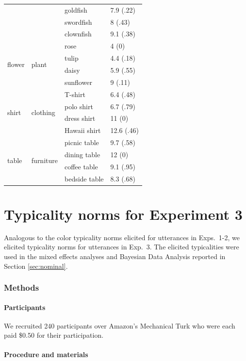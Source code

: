\documentclass[11pt]{article}
\newcommand{\sectionref}[1]{Section \ref{#1}}
\begin{document}
\begin{table}
\begin{tabular}{l l l l}
		& & goldfish & 7.9 (.22)\\
		& & swordfish & 8 (.43)\\
		& & clownfish & 9.1 (.38)\\
	\midrule
	\multirow{4}{*}{flower} & \multirow{4}{*}{plant} & rose & 4 (0)\\
		& & tulip & 4.4 (.18)\\
		& & daisy & 5.9 (.55)\\
		& & sunflower & 9 (.11)\\
	\midrule
	\multirow{4}{*}{shirt} & \multirow{4}{*}{clothing} & T-shirt & 6.4 (.48)\\
		& & polo shirt & 6.7 (.79)\\
		& & dress shirt & 11 (0)\\
		& & Hawaii shirt & 12.6 (.46)\\
	\midrule
	\multirow{4}{*}{table} & \multirow{4}{*}{furniture} & picnic table & 9.7 (.58)\\
		& & dining table & 12 (0)\\
		& & coffee table & 9.1 (.95)\\
		& & bedside table & 8.3 (.68)\\				
	\bottomrule
	\end{tabular}
\end{table}


\section{Typicality norms for Experiment 3}
\label{app:typicalitynorms2}

Analogous to the color typicality norms elicited for utterances in Exps.~1-2, we elicited typicality norms for utterances in Exp.~3. The elicited typicalities were used in the mixed effects analyses and Bayesian Data Analysis reported in \sectionref{sec:nominal}.

\subsubsection{Methods}

\paragraph{Participants}

We recruited 240 participants over Amazon's Mechanical Turk who were each paid \$0.50 for their participation.

\paragraph{Procedure and materials}
\end{document}
